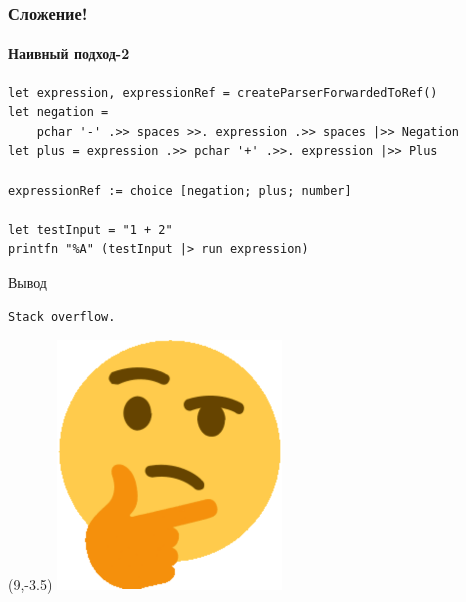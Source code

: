 \documentclass{../../slides-style}
\begin{document}
    \begin{frame}[fragile]
        \frametitle{Сложение!}
        \framesubtitle{Наивный подход-2}
        \begin{verbatim}
let expression, expressionRef = createParserForwardedToRef()
let negation = 
    pchar '-' .>> spaces >>. expression .>> spaces |>> Negation
let plus = expression .>> pchar '+' .>>. expression |>> Plus

expressionRef := choice [negation; plus; number]

let testInput = "1 + 2"
printfn "%A" (testInput |> run expression)
        \end{verbatim}

        \begin{exampleblock}{Вывод}
            \begin{verbatim}
Stack overflow.
            \end{verbatim}
        \end{exampleblock}
        \begin{textblock}{2}(9,-3.5)
            \includegraphics[width=\textwidth]{hmm.png}
        \end{textblock}
    \end{frame}
\end{document}
